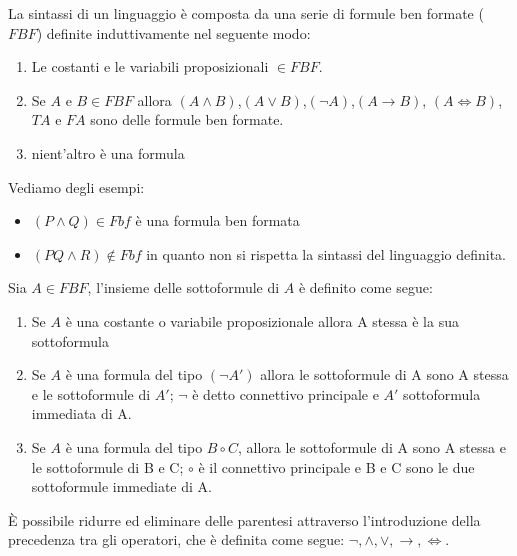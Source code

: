 \documentclass[a4paper,12pt, oneside]{book}
\begin{document}
La sintassi di un linguaggio è composta da una serie di formule ben
formate ($FBF$) definite induttivamente nel seguente modo:
\begin{enumerate}
  \item Le costanti e le variabili proposizionali $\in FBF$.

  \item Se $A$ e $B \in FBF$ allora $(A \land B)$,$(A \lor B)$,$(\neg A)$,$(A
  \rightarrow B)$, $(A \iff B)$, $TA$ e $FA$ sono delle formule ben formate.
  \item nient'altro è una formula
\end{enumerate}

\begin{esempio}
  Vediamo degli esempi:
  \begin{itemize}
    \item $(P \land Q) \in Fbf$  è una formula ben formata\newline
    \item $(PQ \land R) \not \in Fbf$ in quanto non si rispetta la sintassi del
    linguaggio 
    definita. 
  \end{itemize}
\end{esempio}
\begin{definizione}

  Sia $A \in FBF$, l'insieme delle sottoformule di $A$ è definito come segue:
  \begin{enumerate}
    \item Se $A$ è una costante o variabile proposizionale allora A stessa è la
    sua 
    sottoformula 
    \item Se $A$ è una formula del tipo $(\neg A')$ allora le sottoformule di A
    sono 
    A stessa e le sottoformule di $A'$; 
    $\neg$ è detto connettivo principale e $A'$ sottoformula immediata di A.
    \item Se $A$ è una formula del tipo $B \circ C$, allora le sottoformule di A
    sono A stessa 
    e le sottoformule di B e C; $\circ$ è il connettivo principale e B e C sono
    le due sottoformule immediate di A. 
  \end{enumerate}

\end{definizione}
È possibile ridurre ed eliminare delle parentesi attraverso l'introduzione della
precedenza tra gli operatori, che è definita come segue:\newline
$\neg, \land, \lor, \rightarrow,\iff$.
\end{document}
